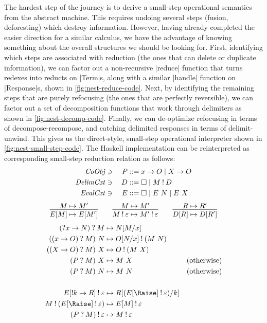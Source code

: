 \documentclass[sigplan,screen]{acmart}
\begin{document}
The hardest step of the journey is to derive a small-step operational semantics
from the abstract machine.  This requires undoing several steps (fusion,
deforesting) which destroy information.  However, having already completed the
easier direction for a similar calculus, we have the advantage of knowing
something about the overall structures we should be looking for.  First,
identifying which steps are associated with reduction (the ones that can delete
or duplicate information), we can factor out a non-recursive \hs|reduce|
function that turns redexes into reducts on \hs|Term|s, along with a similar
\hs|handle| function on \hs|Response|s, shown in \cref{fig:nest-reduce-code}.
Next, by identifying the remaining steps that are purely refocusing (the ones
that are perfectly reversible), we can factor out a set of decomposition
functions that work through delimiters as shown in \cref{fig:nest-decomp-code}.
Finally, we can de-optimize refocusing in terms of decompose-recompose, and
catching delimited responses in terms of delimit-unwind.  This gives us the
direct-style, small-step operational interpreter shown in
\cref{fig:nest-small-step-code}.  The Haskell implementation can be
reinterpreted as corresponding small-step reduction relation as follows:
\begin{alignat*}{3}
  \mathit{CoObj} &\ni{}& P
  &::= x \to O
  \mid X \to O
  \\
  \mathit{DelimCxt} &\ni{}& D
  &::= \square
  \mid M \mathbin{!} D
  \\
  \mathit{EvalCxt} &\ni{}& E
  &::= \square
  \mid E ~ N
  \mid E ~ X
\end{alignat*}
\begin{gather*}
  \infer%
  {E[M] \mapsto E[M']}
  {M \mapsto M'}
  \qquad
  \infer%
  {M \ans \varepsilon \mapsto M' \ans \varepsilon}
  {M \mapsto M'}
  \qquad
  \infer%
  {D[R] \mapsto D[R']}
  {R \mapsto R'}
\end{gather*}
\begin{align*}
  (\ask x \to N) \ask M
  &\mapsto
  N\subst{x}{M}
  \\
  ((x \to O) \ask M) ~ N
  &\mapsto
  O\subst{x}{N} \ans (M ~ N)
  \\
  ((X \to O) \ask M) ~ X
  &\mapsto
  O \ans (M ~ X)
  \\
  (P \ask M) ~ X
  &\mapsto
  M ~ X
  &(\text{otherwise})
  \\
  (P \ask M) ~ N
  &\mapsto
  M ~ N
  &(\text{otherwise})
  \\\\
  E[\ans k \to R] \ans \varepsilon
  &\mapsto
  R\subst{k}{(E[\Raise] \ans \varepsilon)}
  \\
  M \ans (E[\Raise] \ans \varepsilon)
  &\mapsto
  E[M] \ans \varepsilon
  \\
  (P \ask M) \ans \varepsilon
  &\mapsto
  M \ans \varepsilon
\end{align*}
\end{document}
